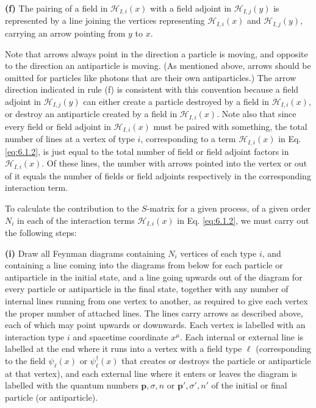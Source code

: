 \noindent\textbf{(f)} The pairing of a field in $\mathcal H_{I,i}(x)$ with a
field adjoint in $\mathcal H_{I,j}(y)$ is represented by a line joining the
vertices representing $\mathcal H_{I,i}(x)$ and $\mathcal H_{I,j}(y)$,
carrying an arrow pointing from $y$ to $x$.

Note that arrows always point in the direction a particle is moving, and
opposite to the direction an antiparticle is moving. (As mentioned above,
arrows should be omitted for particles like photons that are their own
antiparticles.) The arrow direction indicated in rule (f) is consistent with
this convention because a field adjoint in $\mathcal H_{I,j}(y)$ can either
create a particle destroyed by a field in $\mathcal H_{I,i}(x)$, or destroy an
antiparticle created by a field in $\mathcal H_{I,i}(x)$. Note also that since
every field or field adjoint in $\mathcal H_{I,i}(x)$ must be paired with
something, the total number of lines at a vertex of type $i$, corresponding to
a term $\mathcal H_{I,i}(x)$ in Eq. \eqref{eq:6.1.2}, is just equal to the total number
of field or field adjoint factors in $\mathcal H_{I,i}(x)$. Of these lines, the
number with arrows pointed into the vertex or out of it equals the number of
fields or field adjoints respectively in the corresponding interaction term.

To calculate the contribution to the $S$-matrix for a given process, of a given
order $N_i$ in each of the interaction terms $\mathcal H_{I,i}(x)$ in Eq.
\eqref{eq:6.1.2}, we must carry out the following steps:

\noindent\textbf{(i)} Draw all Feynman diagrams containing $N_i$ vertices of
each type $i$, and containing a line coming into the diagrams from below for
each particle or antiparticle in the initial state, and a line going upwards
out of the diagram for every particle or antiparticle in the final state,
together with any number of internal lines running from one vertex to another,
as required to give each vertex the proper number of attached lines. The lines
carry arrows as described above, each of which may point upwards or downwards.
Each vertex is labelled with an interaction type $i$ and spacetime coordinate
$x^\mu$. Each internal or external line is labelled at the end where it runs
into a vertex with a field type $\ell$ (corresponding to the field
$\psi_\ell(x)$ or $\psi_\ell^\dagger(x)$ that creates or destroys the particle
or antiparticle at that vertex), and each external line where it enters or
leaves the diagram is labelled with the quantum numbers $\mathbf p,\sigma,n$
or $\mathbf p',\sigma',n'$ of the initial or final particle (or antiparticle).


